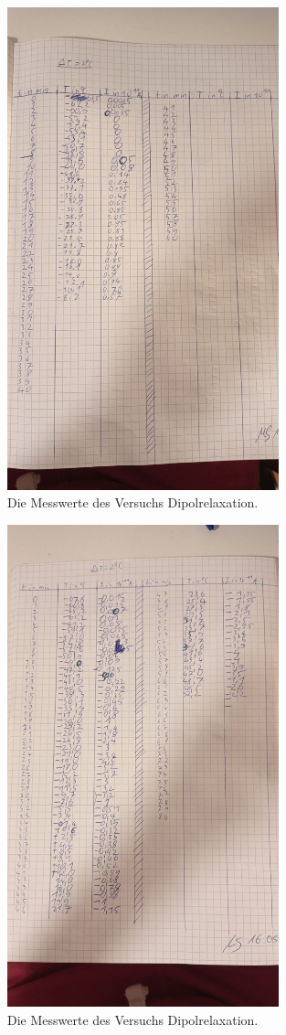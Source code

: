 \begin{figure}[h]
    \centering
    \includegraphics[width=0.7\textwidth]{latex/images/Messwerte_2.jpeg}
    \caption{Die Messwerte des Versuchs Dipolrelaxation.}
\end{figure}

\begin{figure}[h]
    \centering
    \includegraphics[width=0.7\textwidth]{latex/images/Messwerte_3.jpeg}
    \caption{Die Messwerte des Versuchs Dipolrelaxation.}
\end{figure}
